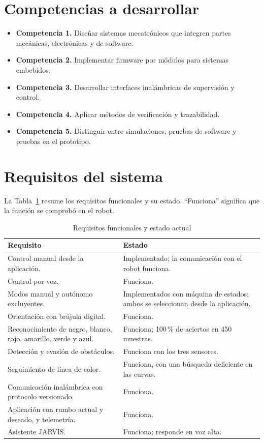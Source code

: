 \documentclass[journal]{IEEEtran}
\begin{document}
\section{Competencias a desarrollar}

\begin{itemize}
    \item \textbf{Competencia 1.} Diseñar sistemas mecatrónicos que integren partes mecánicas, electrónicas y de software.
    \item \textbf{Competencia 2.} Implementar firmware por módulos para sistemas embebidos.
    \item \textbf{Competencia 3.} Desarrollar interfaces inalámbricas de supervisión y control.
    \item \textbf{Competencia 4.} Aplicar métodos de verificación y trazabilidad.
    \item \textbf{Competencia 5.} Distinguir entre simulaciones, pruebas de software y pruebas en el prototipo.
\end{itemize}

\section{Requisitos del sistema}

La Tabla~\ref{tab:requisitos} resume los requisitos funcionales y su estado. ``Funciona'' significa que la función se comprobó en el robot.

\begin{table}[t]
\centering
\caption{Requisitos funcionales y estado actual}
\label{tab:requisitos}
\scriptsize
\begin{tabular}{p{} p{}}
\toprule
\textbf{Requisito} & \textbf{Estado} \\
\midrule
Control manual desde la aplicación. & Implementado; la comunicación con el robot funciona. \\
Control por voz. & Funciona. \\
Modos manual y autónomo excluyentes. & Implementados con máquina de estados; ambos se seleccionan desde la aplicación. \\
Orientación con brújula digital. & Funciona. \\
Reconocimiento de negro, blanco, rojo, amarillo, verde y azul. & Funciona; 100\,\% de aciertos en 450 muestras. \\
Detección y evasión de obstáculos. & Funciona con los tres sensores. \\
Seguimiento de línea de color. & Funciona, con una búsqueda deficiente en las curvas. \\
Comunicación inalámbrica con protocolo versionado. & Funciona. \\
Aplicación con rumbo actual y deseado, y telemetría. & Funciona. \\
Asistente JARVIS. & Funciona; responde en voz alta. \\
\bottomrule
\end{tabular}
\end{table}
\end{document}
